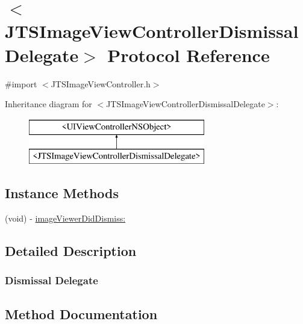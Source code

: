 \hypertarget{protocol_j_t_s_image_view_controller_dismissal_delegate-p}{}\section{$<$J\+T\+S\+Image\+View\+Controller\+Dismissal\+Delegate$>$ Protocol Reference}
\label{protocol_j_t_s_image_view_controller_dismissal_delegate-p}


{\ttfamily \#import $<$J\+T\+S\+Image\+View\+Controller.\+h$>$}

Inheritance diagram for $<$J\+T\+S\+Image\+View\+Controller\+Dismissal\+Delegate$>$\+:\begin{figure}[H]
\begin{center}
\leavevmode
\includegraphics[height=2.000000cm]{protocol_j_t_s_image_view_controller_dismissal_delegate-p}
\end{center}
\end{figure}
\subsection*{Instance Methods}
\begin{DoxyCompactItemize}
\item 
(void) -\/ \hyperlink{protocol_j_t_s_image_view_controller_dismissal_delegate-p_a2ea059c4786124495fe306c172d17933}{image\+Viewer\+Did\+Dismiss\+:}
\end{DoxyCompactItemize}


\subsection{Detailed Description}


 \subsubsection*{Dismissal Delegate }

\subsection{Method Documentation}
\hypertarget{protocol_j_t_s_image_view_controller_dismissal_delegate-p_a2ea059c4786124495fe306c172d17933}{}
